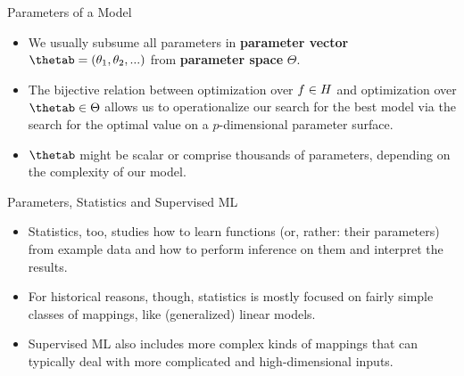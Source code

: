\documentclass[11pt,compress,t,notes=noshow, xcolor=table]{beamer}
\begin{document}
\begin{vbframe}{Parameters of a Model}
\begin{itemize}
  \item We usually subsume all parameters in \textbf{parameter vector} 
  $\thetab = (\theta_1, \theta_2, ...)$ from \textbf{parameter space} 
  $\Theta$.
  
  \item The bijective relation between optimization over $f \in H$ and 
  optimization over $\thetab \in \Theta$ allows us to operationalize our search
  for the best model via the search for the optimal value on a $p$-dimensional
  parameter surface.
  
  \item $\thetab$ might be scalar or comprise thousands of parameters,
  depending on the complexity of our model.
  
  
\end{itemize}

\end{vbframe}


\begin{vbframe}{Parameters, Statistics and Supervised ML}

\begin{itemize}
  
  \item Statistics, too, studies how to learn functions (or, rather: their 
  parameters) from example data and how to perform inference on them and 
  interpret the results.
  
  \item For historical reasons, though, statistics is mostly focused on fairly 
  simple classes of mappings, like (generalized) linear models.
  
  \item Supervised ML also includes more complex kinds of mappings that can 
  typically deal with more complicated and high-dimensional inputs.

\end{itemize} 

\end{vbframe}


\endlecture
\end{document}
